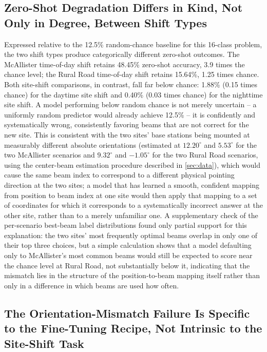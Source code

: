 \documentclass{iutbscthesis}
\begin{document}
\subsection{Zero-Shot Degradation Differs in Kind, Not Only in Degree, Between Shift Types}

Expressed relative to the 12.5\% random-chance baseline for this 16-class problem, the two shift types produce categorically different zero-shot outcomes. The McAllister time-of-day shift retains 48.45\% zero-shot accuracy, 3.9 times the chance level; the Rural Road time-of-day shift retains 15.64\%, 1.25 times chance. Both site-shift comparisons, in contrast, fall far below chance: 1.88\% (0.15 times chance) for the daytime site shift and 0.40\% (0.03 times chance) for the nighttime site shift. A model performing below random chance is not merely uncertain -- a uniformly random predictor would already achieve 12.5\% -- it is confidently and systematically wrong, consistently favoring beams that are not correct for the new site. This is consistent with the two sites' base stations being mounted at measurably different absolute orientations (estimated at $12.20^\circ$ and $5.53^\circ$ for the two McAllister scenarios and $9.32^\circ$ and $-1.05^\circ$ for the two Rural Road scenarios, using the center-beam estimation procedure described in \autoref{sec:data}), which would cause the same beam index to correspond to a different physical pointing direction at the two sites; a model that has learned a smooth, confident mapping from position to beam index at one site would then apply that mapping to a set of coordinates for which it corresponds to a systematically incorrect answer at the other site, rather than to a merely unfamiliar one. A supplementary check of the per-scenario best-beam label distributions found only partial support for this explanation: the two sites' most frequently optimal beams overlap in only one of their top three choices, but a simple calculation shows that a model defaulting only to McAllister's most common beams would still be expected to score near the chance level at Rural Road, not substantially below it, indicating that the mismatch lies in the structure of the position-to-beam mapping itself rather than only in a difference in which beams are used how often.

\subsection{The Orientation-Mismatch Failure Is Specific to the Fine-Tuning Recipe, Not Intrinsic to the Site-Shift Task}
\end{document}

